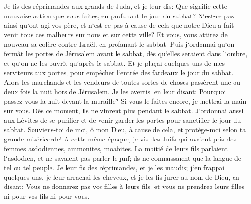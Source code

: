 \verse Je fis des réprimandes aux grands de Juda, et je leur dis: Que signifie cette mauvaise action que vous faites, en profanant le jour du sabbat? 
\verse N`est-ce pas ainsi qu`ont agi vos père, et n`est-ce pas à cause de cela que notre Dieu a fait venir tous ces malheurs sur nous et sur cette ville? Et vous, vous attirez de nouveau sa colère contre Israël, en profanant le sabbat! 
\verse Puis j`ordonnai qu`on fermât les portes de Jérusalem avant le sabbat, dès qu`elles seraient dans l`ombre, et qu`on ne les ouvrît qu`après le sabbat. Et je plaçai quelques-uns de mes serviteurs aux portes, pour empêcher l`entrée des fardeaux le jour du sabbat. 
\verse Alors les marchands et les vendeurs de toutes sortes de choses passèrent une ou deux fois la nuit hors de Jérusalem. 
\verse Je les avertis, en leur disant: Pourquoi passez-vous la nuit devant la muraille? Si vous le faites encore, je mettrai la main sur vous. Dès ce moment, ils ne vinrent plus pendant le sabbat. 
\verse J`ordonnai aussi aux Lévites de se purifier et de venir garder les portes pour sanctifier le jour du sabbat. Souviens-toi de moi, ô mon Dieu, à cause de cela, et protège-moi selon ta grande miséricorde! 
\verse A cette même époque, je vis des Juifs qui avaient pris des femmes asdodiennes, ammonites, moabites. 
\verse La moitié de leurs fils parlaient l`asdodien, et ne savaient pas parler le juif; ils ne connaissaient que la langue de tel ou tel peuple. 
\verse Je leur fis des réprimandes, et je les maudis; j`en frappai quelques-uns, je leur arrachai les cheveux, et je les fis jurer au nom de Dieu, en disant: Vous ne donnerez pas vos filles à leurs fils, et vous ne prendrez leurs filles ni pour vos fils ni pour vous. 
